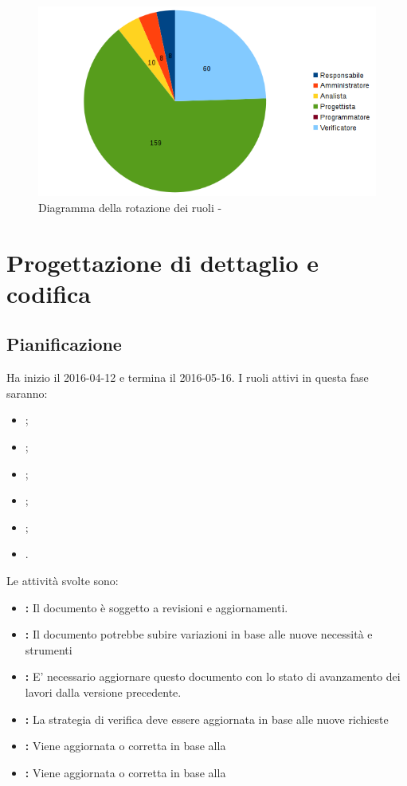 \documentclass[12pt,a4paper]{article}
\begin{document}
\begin{center}
	\begin{figure}[H]
		\centering		\includegraphics[width=\textwidth]{diagrammaTortaProgettazioneArchitetturaleTotaleOre.png}
		\caption{Diagramma della rotazione dei ruoli - \FPA}
	\end{figure}
\end{center}

\newpage
\section{Progettazione di dettaglio e codifica} %

\subsection{Pianificazione}

Ha inizio il 2016-04-12 e termina il 2016-05-16. 
I ruoli attivi in questa fase saranno:
\begin{itemize}
\item \PM;
\item \AM;
\item \AN;
\item \PR;
\item \PG;
\item \VR.
\end{itemize}

Le attività svolte sono:
\begin{itemize}
	\item \textbf{\AdR:} 
	Il documento è soggetto a revisioni e aggiornamenti.
	\item \textbf{\NdP:}
	Il documento potrebbe subire variazioni in base
	alle nuove necessità e strumenti
	\item \textbf{\PdP:}
	E' necessario aggiornare questo documento con lo stato di avanzamento
	dei lavori dalla versione precedente.
	\item \textbf{\PdQ:}
	La strategia di verifica deve essere aggiornata in base 
	alle nuove richieste
	\item \textbf{\ST:}
	Viene aggiornata o corretta in base alla \RP
	\item \textbf{\DP:} 
	Viene aggiornata o corretta in base alla \RP
\end{itemize}
\end{document}
